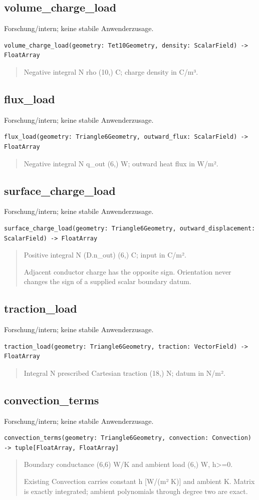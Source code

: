\subsection{volume\_charge\_load}
Forschung/intern; keine stabile Anwenderzusage.
\begin{lstlisting}
volume_charge_load(geometry: Tet10Geometry, density: ScalarField) -> FloatArray
\end{lstlisting}
\begin{quote}
Negative integral N rho (10,) C; charge density in C/m³.
\end{quote}
\subsection{flux\_load}
Forschung/intern; keine stabile Anwenderzusage.
\begin{lstlisting}
flux_load(geometry: Triangle6Geometry, outward_flux: ScalarField) -> FloatArray
\end{lstlisting}
\begin{quote}
Negative integral N q\_out (6,) W; outward heat flux in W/m².
\end{quote}
\subsection{surface\_charge\_load}
Forschung/intern; keine stabile Anwenderzusage.
\begin{lstlisting}
surface_charge_load(geometry: Triangle6Geometry, outward_displacement: ScalarField) -> FloatArray
\end{lstlisting}
\begin{quote}
Positive integral N (D.n\_out) (6,) C; input in C/m².\par Adjacent conductor charge has the opposite sign. Orientation never changes the sign of a supplied scalar boundary datum.
\end{quote}
\subsection{traction\_load}
Forschung/intern; keine stabile Anwenderzusage.
\begin{lstlisting}
traction_load(geometry: Triangle6Geometry, traction: VectorField) -> FloatArray
\end{lstlisting}
\begin{quote}
Integral N prescribed Cartesian traction (18,) N; datum in N/m².
\end{quote}
\subsection{convection\_terms}
Forschung/intern; keine stabile Anwenderzusage.
\begin{lstlisting}
convection_terms(geometry: Triangle6Geometry, convection: Convection) -> tuple[FloatArray, FloatArray]
\end{lstlisting}
\begin{quote}
Boundary conductance (6,6) W/K and ambient load (6,) W, h>=0.\par Existing Convection carries constant h [W/(m² K)] and ambient K. Matrix is exactly integrated; ambient polynomials through degree two are exact.
\end{quote}
